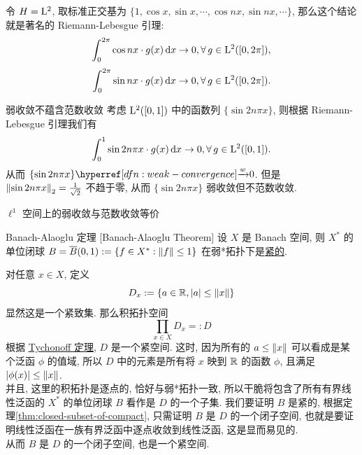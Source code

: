         \begin{rmk}
            [Dedicatia]
            令 \(H=\Lp[2]\), 取标准正交基为 \(\{1, \cos x, \sin x, \cdots, \cos nx, \sin nx, \cdots\}\), 那么这个结论就是著名的 Riemann-Lebesgue 引理:
            \[\int_0^{2\pi} \cos nx \cdot g(x) \dd{x} \to 0, \forall\,g\in\Lp[2]([0,2\pi]),\]
            \[\int_0^{2\pi} \sin nx \cdot g(x) \dd{x} \to 0, \forall\,g\in\Lp[2]([0,2\pi]).\]
        \end{rmk}

        \begin{cxmp}
            {弱收敛不蕴含范数收敛}
            考虑 \(\Lp[2]([0,1])\) 中的函数列 \(\{\sin 2n\pi x\}\), 则根据 Riemann-Lebesgue 引理我们有
            \[\int_0^1 \sin 2n\pi x \cdot g(x) \dd{x} \to 0, \forall\,g\in\Lp[2]([0,1]).\]
            从而 \(\{\sin 2n\pi x\}\wlim 0\). 但是 \(\norm{\sin 2n\pi x}_2 = \frac{1}{\sqrt{2}}\) 不趋于零, 从而 \(\{\sin 2n\pi x\}\) 弱收敛但不范数收敛.
        \end{cxmp}

        \begin{ins}
            {\(\ell^1\) 空间上的弱收敛与范数收敛等价}
        \end{ins}

        \begin{thm}
            {Banach-Alaoglu 定理}
            [Banach-Alaoglu Theorem]
            设 \(X\) 是 Banach 空间, 则 \(X^*\) 的单位闭球 \(B=\overline{B}(0,1):=\{f\in X^*: \norm{f}\leq 1\}\) 在弱*拓扑下是\hyperref[dfn:compact]{紧的}.
        \end{thm}

        \begin{prf}
            对任意 \(x\in X\), 定义
            \[D_x:=\{a\in\operatorname{\mathbb{R}}, |a|\leq\norm{x}\}\]
            显然这是一个紧致集. 那么积拓扑空间 
            \[\prod_{x\in X} D_x=:D\]
            根据 \hyperref[thm:tychonoff]{Tychonoff 定理}, \(D\) 是一个紧空间. 这时, 因为所有的 \(a\leq\norm{x}\) 可以看成是某个泛函 \(\phi\) 的值域, 所以 \(D\) 中的元素是所有将 \(x\) 映到 \(\operatorname{\mathbb{R}}\) 的函数 \(\phi\), 且满足 \(|\phi(x)|\leq\norm{x}\). \\
            并且, 这里的积拓扑是逐点的, 恰好与弱*拓扑一致, 所以干脆将包含了所有有界线性泛函的 \(X^*\) 的单位闭球 \(B\) 看作是 \(D\) 的一个子集.
            我们要证明 \(B\) 是紧的, 根据定理\ref{thm:closed-subset-of-compact}, 只需证明 \(B\) 是 \(D\) 的一个闭子空间, 也就是要证明线性泛函在一族有界泛函中逐点收敛到线性泛函, 这是显而易见的. \\
            从而 \(B\) 是 \(D\) 的一个闭子空间, 也是一个紧空间.
        \end{prf}

